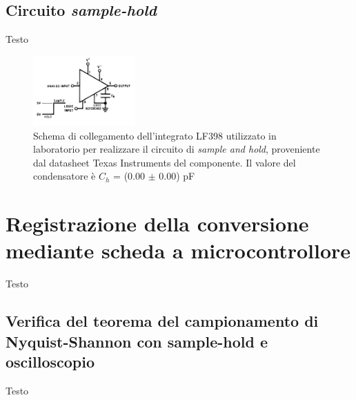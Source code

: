 \documentclass[journal]{IEEEtran}
\begin{document}
\subsection{Circuito \textit{sample-hold}}
Testo


\begin{figure}[H]%
\begin{center}
\includegraphics[width=0.35\textwidth]{sch-simulations/digital/output/lf398.png}
\caption{Schema di collegamento dell'integrato LF398 utilizzato in laboratorio per realizzare il circuito di \textit{sample and hold}, proveniente dal datasheet Texas Instruments del componente. Il valore del condensatore è $C_h$ = (0.00 $\pm$ 0.00) pF}
\label{fig:circuit_sample_and_hold}
\end{center}
\end{figure}

\section{Registrazione della conversione mediante scheda a microcontrollore}
Testo

\subsection{Verifica del teorema del campionamento di Nyquist-Shannon con sample-hold e oscilloscopio}
Testo
\end{document}

